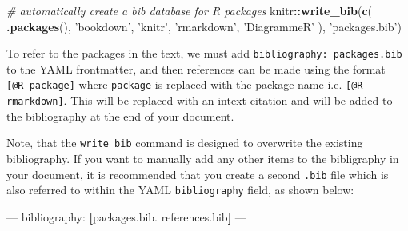 \documentclass[]{book}
\newenvironment{Shaded}{\begin{snugshade}}{\end{snugshade}}
\newcommand{\KeywordTok}[1]{\textcolor[rgb]{0.13,0.29,0.53}{\textbf{#1}}}
\newcommand{\StringTok}[1]{\textcolor[rgb]{0.31,0.60,0.02}{#1}}
\newcommand{\CommentTok}[1]{\textcolor[rgb]{0.56,0.35,0.01}{\textit{#1}}}
\newcommand{\OtherTok}[1]{\textcolor[rgb]{0.56,0.35,0.01}{#1}}
\newcommand{\FunctionTok}[1]{\textcolor[rgb]{0.00,0.00,0.00}{#1}}
\newcommand{\OperatorTok}[1]{\textcolor[rgb]{0.81,0.36,0.00}{\textbf{#1}}}
\newcommand{\AttributeTok}[1]{\textcolor[rgb]{0.77,0.63,0.00}{#1}}
\newcommand{\NormalTok}[1]{#1}
\begin{document}
\begin{Shaded}
\begin{Highlighting}[]
\CommentTok{# automatically create a bib database for R packages}
\NormalTok{knitr}\OperatorTok{::}\KeywordTok{write_bib}\NormalTok{(}\KeywordTok{c}\NormalTok{(}
  \KeywordTok{.packages}\NormalTok{(), }\StringTok{'bookdown'}\NormalTok{, }\StringTok{'knitr'}\NormalTok{, }\StringTok{'rmarkdown'}\NormalTok{, }\StringTok{'DiagrammeR'}
\NormalTok{), }\StringTok{'packages.bib'}\NormalTok{)}
\end{Highlighting}
\end{Shaded}

To refer to the packages in the text, we must add
\texttt{bibliography:\ packages.bib} to the YAML frontmatter, and then
references can be made using the format \texttt{{[}@R-package{]}} where
\texttt{package} is replaced with the package name i.e.
\texttt{{[}@R-rmarkdown{]}}. This will be replaced with an intext
citation and will be added to the bibliography at the end of your
document.

Note, that the \texttt{write\_bib} command is designed to overwrite the
existing bibliography. If you want to manually add any other items to
the bibligraphy in your document, it is recommended that you create a
second \texttt{.bib} file which is also referred to within the YAML
\texttt{bibliography} field, as shown below:

\begin{Shaded}
\begin{Highlighting}[]
\OtherTok{---}
\FunctionTok{bibliography:}\AttributeTok{ }\KeywordTok{[}\NormalTok{packages.bib. references.bib}\KeywordTok{]}
\OtherTok{---}
\end{Highlighting}
\end{Shaded}


\end{document}
